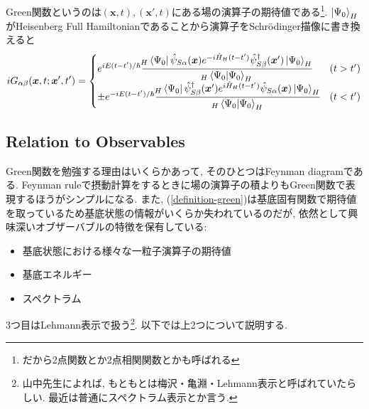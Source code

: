 \documentclass[10.5pt,a4paper]{jreport}
\begin{document}
Green関数というのは$(\bm{x}, t), (\bm{x}', t)$にある場の演算子の期待値である\footnote{だから2点関数とか2点相関関数とかも呼ばれる}. $\ket{\Psi_0}_H$がHeisenberg Full Hamiltonianであることから演算子をSchr\"odinger描像に書き換えると
\begin{eqnarray}
  iG_{\alpha\beta}(\bm{x}, t;\bm{x}', t') =
  \begin{cases}
    e^{iE(t-t')/\hbar}\cfrac{\!_H\bra{\Psi_0}\hat{\psi}_{S\alpha}(\bm{x})e^{-i\hat{H}_H(t-t')}\hat{\psi}_{S\beta}^\dagger(\bm{x}')\ket{\Psi_0}_H}{\!_H\bra{\Psi_0}\ket{\Psi_0}_H} & (t > t')\\
    \pm e^{-iE(t-t')/\hbar}\cfrac{\!_H\bra{\Psi_0}\hat{\psi}_{S\beta}^\dagger(\bm{x}')e^{i\hat{H}_H(t-t')}\hat{\psi}_{S\alpha}(\bm{x})\ket{\Psi_0}_H}{\!_H\bra{\Psi_0}\ket{\Psi_0}_H} & (t < t')
  \end{cases}
    \label{definition-green3}
\end{eqnarray}
\subsection{Relation to Observables}
Green関数を勉強する理由はいくらかあって, そのひとつはFeynman diagramである. Feynman ruleで摂動計算をするときに場の演算子の積よりもGreen関数で表現するほうがシンプルになる. また, (\ref{definition-green})は基底固有関数で期待値を取っているため基底状態の情報がいくらか失われているのだが, 依然として興味深いオブザーバブルの特徴を保有している:
\begin{itemize}
\item 基底状態における様々な一粒子演算子の期待値
\item 基底エネルギー
\item スペクトラム
\end{itemize}
3つ目はLehmann表示で扱う\footnote{山中先生によれば, もともとは梅沢・亀淵・Lehmann表示と呼ばれていたらしい. 最近は普通にスペクトラム表示とか言う. }. 以下では上2つについて説明する.
\end{document}
